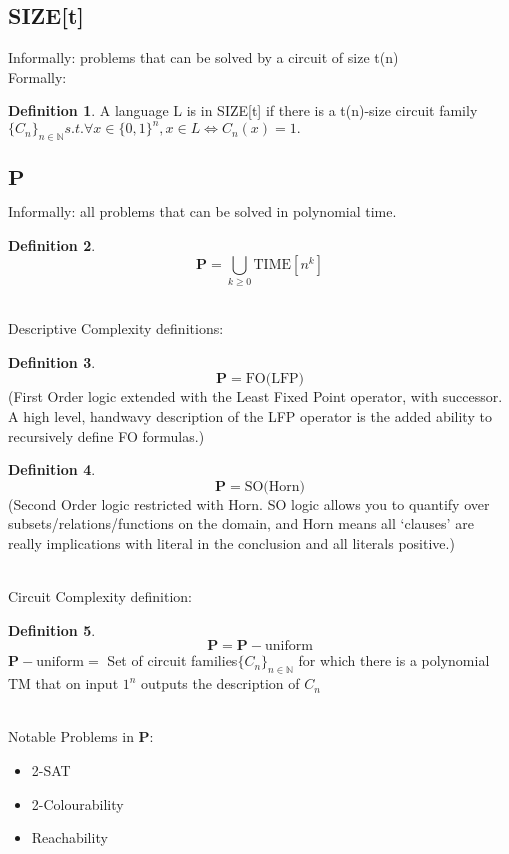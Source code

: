 \documentclass[]{article}
\theoremstyle{definition}
\newtheorem{definition}{Definition}[section]
\begin{document}
\subsection{SIZE[t]}
\label{sec:size}
Informally: problems that can be solved by a circuit of size t(n)
\\
Formally:
\begin{definition}
	A language L is in SIZE[t] if there is a t(n)-size circuit
	family $ \{ C_n \}_{n\in \mathbb{N}} s.t. \forall x \in \{0, 1\}^n, x \in L \iff C_n(x) = 1.$
\end{definition}

\subsection{$\mathbf{P}$}
\label{sec:P}
Informally: all problems that can be solved in polynomial time.
\begin{definition}
	$$\mathbf{P} = \bigcup_{k\geq 0} \hyperref[sec:TIME]{\text{TIME}}[n^{k}]$$
\end{definition}
$ $
\\
\\
Descriptive Complexity definitions: 
\begin{definition}
	$$\mathbf{P} = \text{FO(LFP)}$$
(First Order logic extended with the Least Fixed Point operator, with successor. A high level, handwavy description of the LFP operator is the added ability to recursively define FO formulas.)
\end{definition}
\begin{definition}
	$$\mathbf{P} = \text{SO(Horn)}$$
(Second Order logic restricted with Horn. SO logic allows you to quantify over subsets/relations/functions on the domain, and Horn means all `clauses' are really implications with literal in the conclusion and all literals positive.)
\end{definition}
$ $
\\
\\
Circuit Complexity definition:
\begin{definition}
	$$\textbf{P} = \textbf{P}-\text{uniform}$$
	$\textbf{P}-\text{uniform} = $ Set of circuit families$\{C_n\}_{n\in\mathbb{N}}$ for which there is a polynomial TM that on input $1^n $ outputs the description of $ C_n$
\end{definition}
$ $
\\
\\
Notable Problems in $\mathbf{P}$:
\begin{itemize}
	\item 2-SAT
	\item 2-Colourability
	\item Reachability
\end{itemize}
\end{document}
